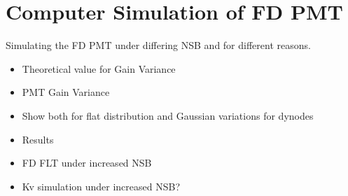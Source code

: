 \chapter[Computer Simulation of FD PMT]{\centering Computer Simulation of FD PMT \\}\label{Ch:CompSimPMT}

Simulating the FD PMT under differing NSB and for different reasons.
\begin{itemize}
\item Theoretical value for Gain Variance
\item PMT Gain Variance
\item Show both for flat distribution and Gaussian variations for dynodes
\item Results
\item FD FLT under increased NSB
\item Kv simulation under increased NSB?
\end{itemize}

